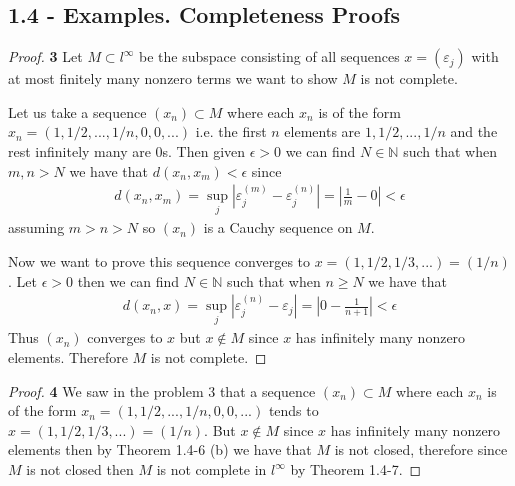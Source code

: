 \documentclass[11pt]{article}
\newcommand{\N}{\mathbb{N}}
\theoremstyle{definition}
\begin{document}
\subsection*{1.4 -  Examples. Completeness Proofs}
\begin{proof}{\textbf{3}}
    Let $M \subset l^\infty$ be the subspace consisting of all sequences
    $x = (\varepsilon_j)$ with at most finitely many nonzero terms we want to
    show $M$ is not complete.

    Let us take a sequence $(x_n) \subset M$ where each $x_n$ is of the form
    $x_n = (1, 1/2, ..., 1/n, 0, 0, ...)$ i.e. the first $n$ elements are 
    $1, 1/2, ..., 1/n$ and the rest infinitely many are $0$s.
    Then given $\epsilon > 0$ we can find $N \in \N$ such that when
    $m, n> N$ we have that $d(x_n, x_m) < \epsilon$ since
    \begin{align*}
        d(x_n, x_m) = \sup_j |\varepsilon_j^{(m)} - \varepsilon_j^{(n)}|
        = \left|\frac{1}{m} - 0\right| < \epsilon
    \end{align*}
    assuming $m > n > N$ so $(x_n)$ is a Cauchy sequence on $M$.

    Now we want to prove this sequence converges to
    $x = (1, 1/2, 1/3, ...) = (1/n)$. Let $\epsilon > 0$ then we can find
    $N \in \N$ such that when $n \geq N$ we have that
    \begin{align*}
        d(x_n, x) = \sup_j |\varepsilon_j^{(n)} - \varepsilon_j|
        = \left|0 - \frac{1}{n+1}\right| < \epsilon
    \end{align*}
    Thus $(x_n)$ converges to $x$ but $x \not\in M$ since $x$ has
    infinitely many nonzero elements. Therefore $M$ is not complete.
\end{proof}
\begin{proof}{\textbf{4}}
    We saw in the problem $3$ that a sequence $(x_n) \subset M$
    where each $x_n$ is of the form $x_n = (1, 1/2, ..., 1/n, 0, 0, ...)$
    tends to $x = (1, 1/2, 1/3, ...) = (1/n)$. But $x \not\in M$ since $x$ has
    infinitely many nonzero elements then by Theorem 1.4-6 (b) we have that
    $M$ is not closed, therefore since $M$ is not closed then $M$ is not
    complete in $l^{\infty}$ by Theorem 1.4-7. 
\end{proof}
\end{document}
